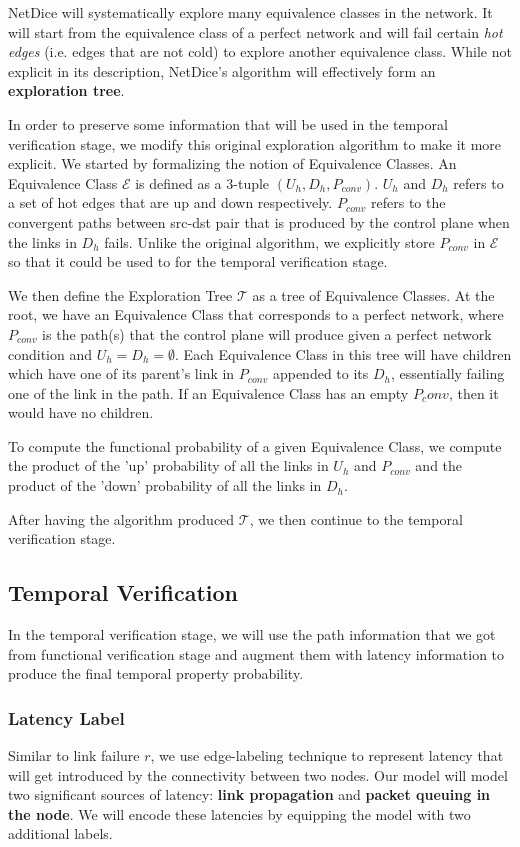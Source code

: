 \documentclass[10pt,sigconf,letterpaper,anonymous,nonacm]{acmart}
\begin{document}
NetDice will systematically explore many equivalence classes in the network. 
It will start from the equivalence class of a perfect network and will fail certain 
\textit{hot edges} (i.e. edges that are not cold) to explore another equivalence 
class.
While not explicit in its description, NetDice's algorithm will effectively form an 
\textbf{exploration tree}. 

In order to preserve some information that will be used in the temporal verification 
stage, we modify this original exploration algorithm to make it more explicit.
We started by formalizing the notion of Equivalence Classes.
An Equivalence Class $\mathcal{E}$ is defined as a 3-tuple $(U_h, D_h, P_{conv})$.
$U_h$ and $D_h$ refers to a set of hot edges that are up and down respectively.
$P_{conv}$ refers to the convergent paths between src-dst pair that is produced by the
control plane when the links in $D_h$ fails.
Unlike the original algorithm, we explicitly store $P_{conv}$ in $\mathcal{E}$ so that 
it could be used to for the temporal verification stage.

We then define the Exploration Tree $\mathcal{T}$ as a tree of Equivalence Classes.
At the root, we have an Equivalence Class that corresponds to a perfect network, where 
$P_{conv}$ is the path(s) that the control plane will produce given a perfect network 
condition and $U_h = D_h = \emptyset$.
Each Equivalence Class in this tree will have children which have one of its parent's link in 
$P_{conv}$ appended to its $D_h$, essentially failing one of the link in the path.
If an Equivalence Class has an empty $P_conv$, then it would have no children.

To compute the functional probability of a given Equivalence Class, we compute the 
product of the 'up' probability of all the links in $U_h$ and $P_{conv}$ and the 
product of the 'down' probability of all the links in $D_h$.

After having the algorithm produced $\mathcal{T}$, we then continue to the temporal verification 
stage.

\subsection{Temporal Verification}
In the temporal verification stage, we will use the path information that we got from 
functional verification stage and augment them with latency information to 
produce the final temporal property probability.

\subsubsection{Latency Label}
Similar to link failure $r$, we use edge-labeling technique to represent latency that 
will get introduced by the connectivity between two nodes. 
Our model will model two significant sources of latency: \textbf{link propagation} 
and \textbf{packet queuing in the node}.
We will encode these latencies by equipping the model with two additional labels.
\end{document}
